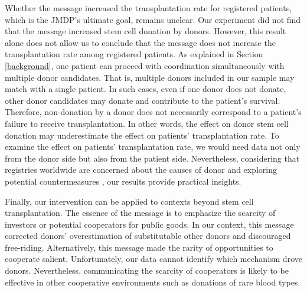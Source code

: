 \documentclass[12pt, a4paper]{article}
\newcommand{\revise}[1]{{\color{red}{#1}}}
\begin{document}
Whether the \revise{matching difficulty} message increased the transplantation rate for registered patients, which is the JMDP's ultimate goal, remains unclear. Our experiment did not find that the \revise{matching difficulty} message increased stem cell donation by donors. However, this result alone does not allow us to conclude that the \revise{matching difficulty} message does not increase the transplantation rate among registered patients. As explained in Section \ref{background}, one patient can proceed with coordination simultaneously with multiple donor candidates. That is, multiple donors included in our sample may match with a single patient. In such cases, even if one donor does not donate, other donor candidates may donate and contribute to the patient's survival. Therefore, non-donation by a donor does not necessarily correspond to a patient's failure to receive transplantation. In other words, the effect on donor stem cell donation may underestimate the effect on patients' transplantation rate. To examine the effect on patients' transplantation rate, we would need data not only from the donor side but also from the patient side. Nevertheless, considering that registries worldwide are concerned about the causes of donor \revise{dropout} and exploring potential countermeasures \citep[for example,][]{Switzer2018, Balassa2019, Hamed2023, Haylock2024}, our results provide practical insights.

Finally, our intervention can be applied to contexts beyond stem cell transplantation. The essence of the \revise{matching difficulty} message is to emphasize the scarcity of investors or potential cooperators for public goods. In our context, this message corrected donors' overestimation of substitutable other donors and discouraged free-riding. Alternatively, this message made the rarity of opportunities to cooperate salient. Unfortunately, our data cannot identify which mechanism drove donors. Nevertheless, communicating the scarcity of cooperators is likely to be effective in other cooperative environments such as donations of rare blood types.
\end{document}
